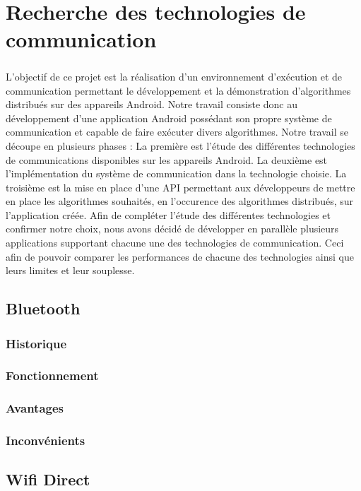 \documentclass[a4paper,10pt]{report}
\begin{document}
\chapter{Recherche des technologies de communication}
  \paragraph{}
  L'objectif de ce projet est la réalisation d'un environnement d'exécution et de communication permettant le développement et la démonstration d'algorithmes distribués sur des appareils Android. Notre travail consiste donc au développement d'une application Android possédant son propre système de communication et capable de faire exécuter divers algorithmes.
  Notre travail se découpe en plusieurs phases :
  La première est l'étude des différentes technologies de communications disponibles sur les appareils Android.
  La deuxième est l'implémentation du système de communication dans la technologie choisie.
  La troisième est la mise en place d'une API permettant aux développeurs de mettre en place les algorithmes souhaités, en l'occurence des algorithmes distribués, sur l'application créée.
  Afin de compléter l'étude des différentes technologies et confirmer notre choix, nous avons décidé de développer en parallèle plusieurs applications supportant chacune une des technologies de communication. Ceci afin de pouvoir comparer les performances de chacune des technologies ainsi que leurs limites et leur souplesse.
  \section{Bluetooth}
    \subsection{Historique}
    \subsection{Fonctionnement} 
    \subsection{Avantages}
    \subsection{Inconvénients}
  \section{Wifi Direct}
\end{document}
